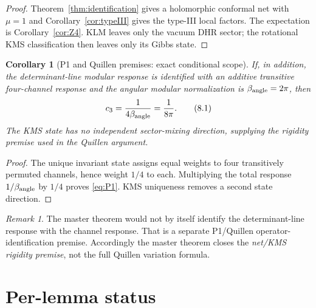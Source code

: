 \documentclass[11pt]{article}
\newtheorem{corollary}[theorem]{Corollary}
\theoremstyle{remark}
\newtheorem{remark}[theorem]{Remark}
\begin{document}
\begin{proof}
Theorem~\ref{thm:identification} gives a holomorphic conformal net with
$\mu=1$ and Corollary~\ref{cor:typeIII} gives the type-III local factors.
The expectation is Corollary~\ref{cor:Z4}.  KLM leaves only the vacuum
DHR sector; the rotational KMS classification then leaves only its Gibbs
state.
\end{proof}

\begin{corollary}[P1 and Quillen premises: exact conditional scope]
If, in addition, the determinant-line modular response is identified
with an additive transitive four-channel response and the angular modular
normalization is $\beta_{\rm angle}=2\pi$, then
\[
 c_3=\frac1{4\beta_{\rm angle}}=\frac1{8\pi}.
\tag{8.1}\label{eq:P1}
\]
The KMS state has no independent sector-mixing direction, supplying the
rigidity premise used in the Quillen argument.
\end{corollary}

\begin{proof}
The unique invariant state assigns equal weights to four transitively
permuted channels, hence weight $1/4$ to each.  Multiplying the total
response $1/\beta_{\rm angle}$ by $1/4$ proves \eqref{eq:P1}.
KMS uniqueness removes a second state direction.
\end{proof}

\begin{remark}
The master theorem would not by itself identify the determinant-line
response with the channel response.  That is a separate
P1/Quillen operator-identification premise.  Accordingly the master
theorem closes the \emph{net/KMS rigidity premise}, not the full Quillen
variation formula.
\end{remark}

\section{Per-lemma status}
\end{document}
